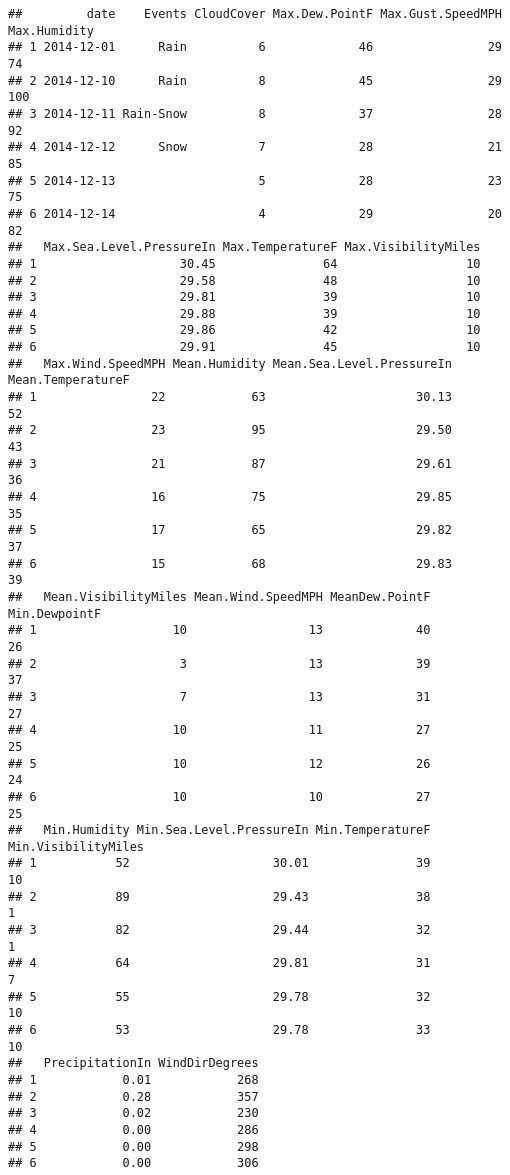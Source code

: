 \documentclass[
]{article}
\begin{document}
\begin{verbatim}
##         date    Events CloudCover Max.Dew.PointF Max.Gust.SpeedMPH Max.Humidity
## 1 2014-12-01      Rain          6             46                29           74
## 2 2014-12-10      Rain          8             45                29          100
## 3 2014-12-11 Rain-Snow          8             37                28           92
## 4 2014-12-12      Snow          7             28                21           85
## 5 2014-12-13                    5             28                23           75
## 6 2014-12-14                    4             29                20           82
##   Max.Sea.Level.PressureIn Max.TemperatureF Max.VisibilityMiles
## 1                    30.45               64                  10
## 2                    29.58               48                  10
## 3                    29.81               39                  10
## 4                    29.88               39                  10
## 5                    29.86               42                  10
## 6                    29.91               45                  10
##   Max.Wind.SpeedMPH Mean.Humidity Mean.Sea.Level.PressureIn Mean.TemperatureF
## 1                22            63                     30.13                52
## 2                23            95                     29.50                43
## 3                21            87                     29.61                36
## 4                16            75                     29.85                35
## 5                17            65                     29.82                37
## 6                15            68                     29.83                39
##   Mean.VisibilityMiles Mean.Wind.SpeedMPH MeanDew.PointF Min.DewpointF
## 1                   10                 13             40            26
## 2                    3                 13             39            37
## 3                    7                 13             31            27
## 4                   10                 11             27            25
## 5                   10                 12             26            24
## 6                   10                 10             27            25
##   Min.Humidity Min.Sea.Level.PressureIn Min.TemperatureF Min.VisibilityMiles
## 1           52                    30.01               39                  10
## 2           89                    29.43               38                   1
## 3           82                    29.44               32                   1
## 4           64                    29.81               31                   7
## 5           55                    29.78               32                  10
## 6           53                    29.78               33                  10
##   PrecipitationIn WindDirDegrees
## 1            0.01            268
## 2            0.28            357
## 3            0.02            230
## 4            0.00            286
## 5            0.00            298
## 6            0.00            306
\end{verbatim}
\end{document}
